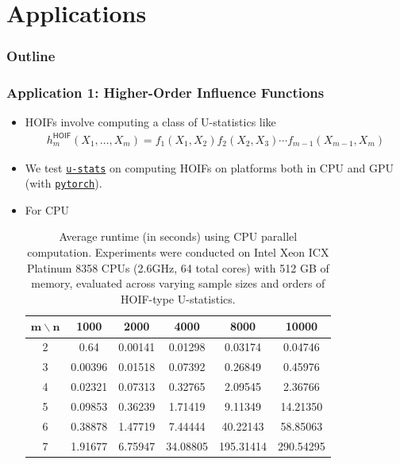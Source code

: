 \documentclass[9pt]{beamer}
\theoremstyle{mystyle}
\theoremstyle{mystyletwo}
\newcommand{\libref}[2]{\href{#2}{\texttt{#1}}}
\newcommand{\torch}{\libref{pytorch}{https://pytorch.org/}}
\def\package{\libref{u-stats}{https://github.com/Amedar-Asterisk/U-Statistics-python}}
\begin{document}
\section{Applications}
\begin{frame}
    \frametitle{Outline}
    \tableofcontents[currentsection, sectionstyle=show/shaded, subsectionstyle=show/shaded/shaded]
\end{frame}
\begin{frame}
    \frametitle{Application 1: Higher-Order Influence Functions}
    \begin{itemize}
        \item HOIFs involve computing a class of U-statistics like
              \begin{align*}
                h^{\mathsf{HOIF}}_m(X_{1}, \ldots, X_{m})  = f_1(X_{1},X_{2})  f_2(X_{2},X_{3}) \cdots f_{m-1}(X_{m-1},X_{m})
              \end{align*}
        \item We test \package{} on computing HOIFs on platforms both in CPU and GPU (with \torch).
        \item For CPU
              \begin{table}[htbp]
                  \centering
                  \caption{Average runtime (in seconds) using CPU parallel computation. Experiments were conducted on Intel Xeon ICX Platinum 8358 CPUs (2.6GHz, 64 total cores) with 512 GB of memory, evaluated across varying sample sizes and orders of HOIF-type U-statistics.}
                  \label{tab:HOIF_CPU}
                  \begin{tabular}{cccccc}
                      \toprule
                      $\bm{m} \backslash \bm{n}$ & \textbf{1000} & \textbf{2000} & \textbf{4000} & \textbf{8000} & \textbf{10000} \\
                      \midrule
                      2                          & 0.64          & 0.00141       & 0.01298       & 0.03174       & 0.04746        \\
                      3                          & 0.00396       & 0.01518       & 0.07392       & 0.26849       & 0.45976        \\
                      4                          & 0.02321       & 0.07313       & 0.32765       & 2.09545       & 2.36766        \\
                      5                          & 0.09853       & 0.36239       & 1.71419       & 9.11349       & 14.21350       \\
                      6                          & 0.38878       & 1.47719       & 7.44444       & 40.22143      & 58.85063       \\
                      7                          & 1.91677       & 6.75947       & 34.08805      & 195.31414     & 290.54295      \\
                      \bottomrule
                  \end{tabular}
              \end{table}
    \end{itemize}
\end{frame}
\end{document}
